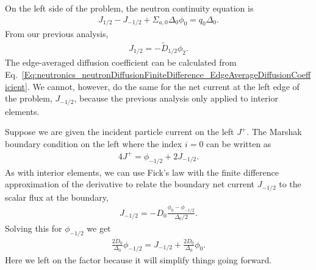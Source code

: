 On the left side of the problem, the neutron continuity equation is
\begin{align}
  J_{1/2} - J_{-1/2} + \Sigma_{a,0} \Delta_0 \phi_0 = q_0 \Delta_0 .
\end{align}
From our previous analysis,
\begin{align}
  J_{1/2} = -\widetilde{D}_{1/2} \phi_2 .
\end{align}
The edge-averaged diffusion coefficient can be calculated from Eq.~\eqref{Eq:neutronics_neutronDiffusionFiniteDifference_EdgeAverageDiffusionCoefficient}. We cannot, however, do the same for the net current at the left edge of the problem, $J_{-1/2}$, because the previous analysis only applied to interior elements.

Suppose we are given the incident particle current on the left $J^+$. The Marshak boundary condition on the left where the index $i = 0$ can be written as
\begin{align}
  4 J^+ = \phi_{-1/2} + 2 J_{-1/2} .
\end{align}
As with interior elements, we can use Fick's law with the finite difference approximation of the derivative to relate the boundary net current $J_{-1/2}$ to the scalar flux at the boundary,
\begin{align}
  J_{-1/2} = -D_0 \frac{ \phi_0 - \phi_{-1/2} }{ \Delta_0 / 2 } .
\end{align}
Solving this for $\phi_{-1/2}$ we get
\begin{align}
  \frac{ 2 D_0 }{ \Delta_0 } \phi_{-1/2} = J_{-1/2} + \frac{ 2 D_0 }{ \Delta_0 } \phi_0 .
\end{align}
Here we left on the factor because it will simplify things going forward.

